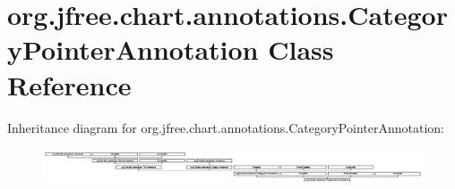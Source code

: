 \hypertarget{classorg_1_1jfree_1_1chart_1_1annotations_1_1_category_pointer_annotation}{}\section{org.\+jfree.\+chart.\+annotations.\+Category\+Pointer\+Annotation Class Reference}
\label{classorg_1_1jfree_1_1chart_1_1annotations_1_1_category_pointer_annotation}
Inheritance diagram for org.\+jfree.\+chart.\+annotations.\+Category\+Pointer\+Annotation\+:\begin{figure}[H]
\begin{center}
\leavevmode
\includegraphics[height=1.073620cm]{classorg_1_1jfree_1_1chart_1_1annotations_1_1_category_pointer_annotation}
\end{center}
\end{figure}
